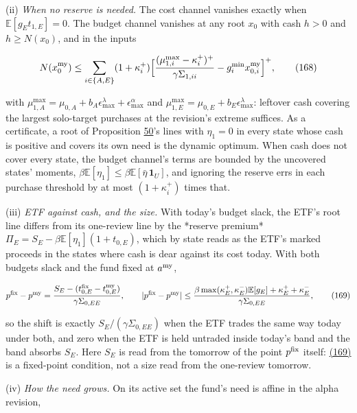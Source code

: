 \documentclass[11pt]{article}
\begin{document}
(ii) \emph{When no reserve is needed.} The cost channel vanishes exactly when
\(\mathbb E[g_Et_{1,E}]=0\). The budget channel vanishes at any root \(x_0\) with cash
\(h>0\) and \(h\geq N(x_0)\), and in the inputs

\begin{equation*}
N(x^{\rm my}_0)\leq\sum_{i\in\{A,E\}}(1+\kappa^+_i)\Bigl[\frac{(\mu_{1,i}^{\max}-\kappa^+_i)^+}{\gamma\Sigma_{1,ii}}-g^{\min}_ix^{\rm my}_{0,i}\Bigr]^+,\tag{168}\label{eq:168}
\end{equation*}

with \(\mu^{\max}_{1,A}=\mu_{0,A}+b_A\epsilon^\lambda_{\max}+\epsilon^\alpha_{\max}\) and \(\mu^{\max}_{1,E}=\mu_{0,E}+b_E\epsilon^\lambda_{\max}\): leftover cash
covering the largest solo-target purchases at the revision's extreme
suffices. As a certificate, a root of Proposition \hyperref[res:Proposition-50]{50}'s lines with
\(\eta_1=0\) in every state whose cash is positive and covers its own need
is the dynamic optimum. When cash does not cover every state, the
budget channel's terms are bounded by the uncovered states' moments,
\(\beta\mathbb E[\eta_1]\leq\beta\mathbb E[\bar\eta\,\mathbf 1_U]\), and ignoring the reserve errs in each purchase
threshold by at most \((1+\kappa^+_i)\) times that.

(iii) \emph{ETF against cash, and the size.} With today's budget slack, the
ETF's root line differs from its one-review line by the *reserve
premium* \(\Pi_E=S_E-\beta\mathbb E[\eta_1](1+t_{0,E})\), which by state reads as the ETF's
marked proceeds in the states where cash is dear against its cost
today. With both budgets slack and the fund fixed at \(a^{\rm my}\),

\begin{equation*}
p^{\rm fix}-p^{\rm my}=\frac{S_E-(t^{\rm fix}_{0,E}-t^{\rm my}_{0,E})}{\gamma\Sigma_{0,EE}},\qquad
|p^{\rm fix}-p^{\rm my}|\leq\frac{\beta\max(\kappa^+_E,\kappa^-_E)\mathbb E[g_E]+\kappa^+_E+\kappa^-_E}{\gamma\Sigma_{0,EE}},\tag{169}\label{eq:169}
\end{equation*}

so the shift is exactly \(S_E/(\gamma\Sigma_{0,EE})\) when the ETF trades the same way
today under both, and zero when the ETF is held untraded inside
today's band and the band absorbs \(S_E\). Here \(S_E\) is read from the
tomorrow of the point \(p^{\rm fix}\) itself: \hyperref[eq:169]{(169)} is a fixed-point
condition, not a size read from the one-review tomorrow.

(iv) \emph{How the need grows.} On its active set the fund's need is affine
in the alpha revision,
\end{document}
